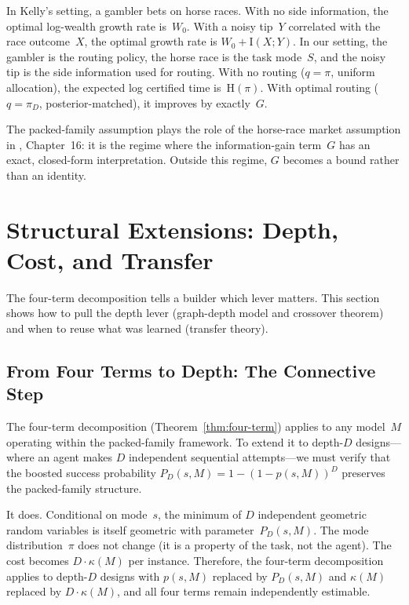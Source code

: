 \documentclass[twoside,11pt]{article}
\newcommand{\MI}{\mathrm{I}}
\newcommand{\Hent}{\mathrm{H}}
\begin{document}
In Kelly's setting, a gambler bets on horse races.
With no side information, the optimal log-wealth growth rate is~$W_0$.
With a noisy tip~$Y$ correlated with the race outcome~$X$, the optimal growth rate is $W_0 + \MI(X; Y)$.
In our setting, the gambler is the routing policy, the horse race is the task mode~$S$, and the noisy tip is the side information used for routing.
With no routing ($q = \pi$, uniform allocation), the expected log certified time is~$\Hent(\pi)$.
With optimal routing ($q = \pi_D$, posterior-matched), it improves by exactly~$G$.

The packed-family assumption plays the role of the horse-race market assumption in \citet{cover2006elements}, Chapter~16: it is the regime where the information-gain term~$G$ has an exact, closed-form interpretation.
Outside this regime, $G$ becomes a bound rather than an identity.

\section{Structural Extensions: Depth, Cost, and Transfer}
\label{sec:extensions}

The four-term decomposition tells a builder which lever matters.
This section shows how to pull the depth lever (graph-depth model and crossover theorem) and when to reuse what was learned (transfer theory).

\subsection{From Four Terms to Depth: The Connective Step}
\label{sec:connective}

The four-term decomposition (Theorem~\ref{thm:four-term}) applies to any model~$M$ operating within the packed-family framework.
To extend it to depth-$D$ designs---where an agent makes $D$ independent sequential attempts---we must verify that the boosted success probability $P_D(s, M) = 1 - (1 - p(s,M))^D$ preserves the packed-family structure.

It does.
Conditional on mode~$s$, the minimum of $D$ independent geometric random variables is itself geometric with parameter~$P_D(s, M)$.
The mode distribution~$\pi$ does not change (it is a property of the task, not the agent).
The cost becomes $D \cdot \kappa(M)$ per instance.
Therefore, the four-term decomposition applies to depth-$D$ designs with $p(s,M)$ replaced by $P_D(s,M)$ and $\kappa(M)$ replaced by $D \cdot \kappa(M)$, and all four terms remain independently estimable.
\end{document}
